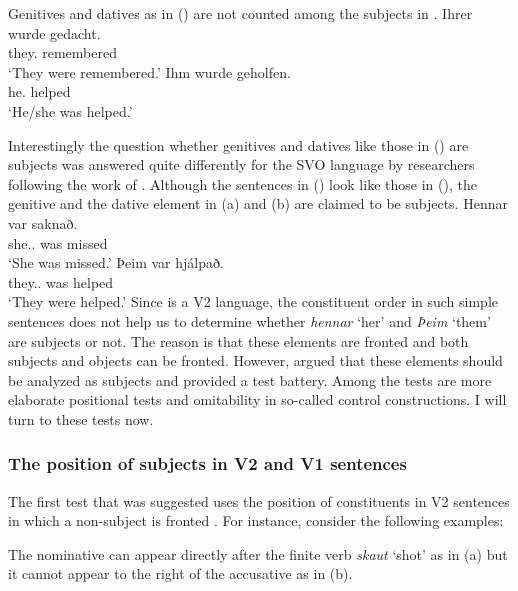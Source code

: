 Genitives and datives as in () are not counted among the subjects in .
\eal
\ex 
\gll Ihrer       wurde gedacht.\\
     they.\GEN{} \AUX{} remembered\\\german
\glt `They were remembered.'
\ex 
\gll Ihm       wurde  geholfen.\\
     he.\DAT{} \AUX{} helped\\
\glt `He/she was helped.'
\zl

\noindent
Interestingly the question whether genitives and datives like those in () are subjects was
answered quite differently for the SVO language  by researchers following the work of
\citet*{ZMT85a}. Although the sentences in () look like those in (), the genitive and
the dative element in (a) and (b) are claimed to be subjects.
\eal
\label{ex-subject-icelandic-passive-v2}
\ex 
\gll Hennar var saknað.\\
     she.\SG.\GEN{} was missed\\\icelandic
\glt `She was missed.'
\ex 
\gll Þeim            var hjálpað.\\
     they.\PL.\DAT{} was helped\\
\glt `They were helped.'
\zl
Since  is a V2 language, the constituent order in such simple sentences does not help us to
determine whether \emph{hennar} `her' and \emph{Þeim} `them' are subjects or not. The reason is that
these elements are fronted and both subjects and objects can be fronted. However, \citet*{ZMT85a} argued that
these elements should be analyzed as subjects and provided a test battery. Among the tests are more
elaborate positional tests and omitability in so-called control constructions. I will turn to these
tests now.


\subsubsection{The position of subjects in V2 and V1 sentences}


The first test that was suggested uses the position of constituents in V2 sentences in which a
non-subject is fronted \citep*[Section~2.3]{ZMT85a}. For instance, consider the following examples:

\eal
\zl
The nominative can appear directly after the finite verb \emph{skaut} `shot' as in (a) but it
cannot appear to the right of the accusative as in (b).

